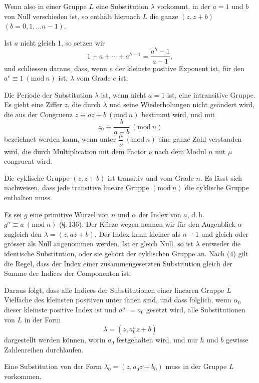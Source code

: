 
Wenn also in einer Gruppe $L$ eine Substitution $\lambda$ vorkommt, in der $a = 1$ und $b$ von Null verschieden ist, so enthält hiernach $L$ die ganze  $(z, z + b)$ $(b = 0, 1, \ldots n - 1)$.

Ist $a$ nicht gleich 1, so setzen wir
\[
1 + a + \cdots + a^{h-1} = \frac{a^h - 1}{a - 1},
\]
und schliessen daraus, dass, wenn $e$ der kleinste positive Exponent ist, für den $a^e \equiv 1\ (\mathrm{mod}\ n)$ ist, $\lambda$ vom Grade $e$ ist.

Die Periode der Substitution $\lambda$ ist, wenn nicht $a = 1$ ist, eine intransitive Gruppe. Es giebt eine Ziffer $z$, die durch $\lambda$ und seine Wiederholungen nicht geändert wird, die aus der Congruenz $z \equiv az + b\ (\mathrm{mod}\ n)$ bestimmt wird, und mit
\[
z_0 \equiv \frac{b}{a - b}\ (\mathrm{mod}\ n)
\]
bezeichnet werden kann, wenn unter $\dfrac{\mu}{\nu}\ (\mathrm{mod}\ n)$ eine ganze Zahl verstanden wird, die durch Multiplication mit dem Factor $\nu$ nach dem Modul $n$ mit $\mu$ congruent wird.

Die cyklische Gruppe $(z, z + b)$ ist transitiv und vom Grade $n$. Es lässt sich nachweisen, dass jede transitive lineare Gruppe $(\mathrm{mod}\ n)$ die cyklische Gruppe enthalten muss.

Es sei $g$ eine primitive Wurzel von $n$ und $\alpha$ der Index von $a$, d.\,h. $g^\alpha \equiv a\ (\mathrm{mod}\ n)$ (\S.\,136). Der Kürze wegen nennen wir für den Augenblick $\alpha$ zugleich den  $\lambda = (z, az + b)$. Der Index kann kleiner als $n - 1$ und gleich oder grösser als Null angenommen werden. Ist er gleich Null, so ist $\lambda$ entweder die identische Substitution, oder sie gehört der cyklischen Gruppe an. Nach (4) gilt die Regel, dass der Index einer zusammengesetzten Substitution gleich der Summe der Indices der Componenten ist.

Daraus folgt, dass alle Indices der Substitutionen einer linearen Gruppe $L$ Vielfache des kleinsten positiven unter ihnen sind, und dass folglich, wenn $\alpha_0$ dieser kleinste positive Index ist und $a^{\alpha_0} = a_0$ gesetzt wird, alle Substitutionen von $L$ in der Form
\[
\lambda = (z, a_0^h z + b)
\]
dargestellt werden können, worin $a_0$ festgehalten wird, und nur $h$ und $b$ gewisse Zahlenreihen durchlaufen.

Eine Substitution von der Form $\lambda_0 = (z, a_0 z + b_0)$ muss in der Gruppe $L$ vorkommen.
